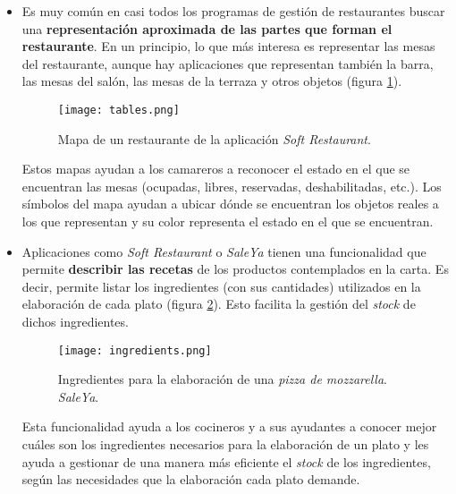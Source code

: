     \begin{itemize}
    \item Es muy común en casi todos los programas de gestión de restaurantes
    buscar una \textbf{representación aproximada de las partes que forman el
    restaurante}. En un principio, lo que más interesa es representar las 
    mesas del restaurante, aunque hay aplicaciones que representan también
    la barra, las mesas del salón, las mesas de la terraza y otros objetos
    (figura \ref{fig:tables}).

    \begin{figure}[!h]
      \begin{center}
        \texttt{[image: tables.png]}
        \caption{Mapa de un restaurante de la aplicación
        \emph{Soft Restaurant}\cite{bib:softRestaurant}.}
        \label{fig:tables}
      \end{center}
    \end{figure}

    Estos mapas ayudan a los camareros a reconocer el estado en el que se
    encuentran las mesas (ocupadas, libres, reservadas, deshabilitadas, etc.).
    Los símbolos del mapa ayudan a ubicar dónde se encuentran los objetos
    reales a los que representan y su color representa el estado en el que
    se encuentran.

    \item Aplicaciones como \emph{Soft Restaurant}\cite{bib:softRestaurant} o 
    \emph{SaleYa}\cite{bib:saleYa} tienen una funcionalidad que permite 
    \textbf{describir las recetas} de los productos contemplados en la carta. 
    Es decir, permite listar los ingredientes (con sus cantidades) utilizados 
    en la elaboración de cada plato (figura \ref{fig:ingredients}). Esto 
    facilita la gestión del \emph{stock} de dichos ingredientes.

    \begin{figure}[!h]
      \begin{center}
        \texttt{[image: ingredients.png]}
        \caption{Ingredientes para la elaboración de una \emph{pizza de 
        mozzarella}. \emph{SaleYa}\cite{bib:saleYa}.}
        \label{fig:ingredients}
      \end{center}
    \end{figure}

    Esta funcionalidad ayuda a los cocineros y a sus ayudantes a conocer
    mejor cuáles son los ingredientes necesarios para la elaboración de 
    un plato y les ayuda a gestionar de una manera más eficiente el
    \emph{stock} de los ingredientes, según las necesidades que la 
    elaboración cada plato demande.


\end{itemize}
